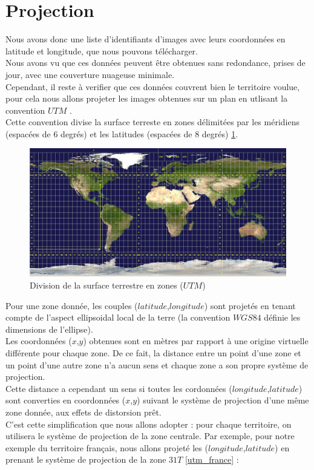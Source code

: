 \documentclass{book}
\begin{document}
\clearpage

\section{Projection}

Nous avons donc une liste d'identifiants d'images avec leurs coordonnées en latitude et longitude, que nous pouvons télécharger.\\
Nous avons vu que ces données peuvent être obtenues sans redondance, prises de jour, avec une couverture nuageuse minimale.\\
Cependant, il reste à verifier que ces données couvrent bien le territoire voulue, pour cela nous allons projeter les images obtenues
sur un plan en utlisant la convention $UTM$ \cite{wiki:utm}.\\
Cette convention divise la surface terreste en zones délimitées par les méridiens (espacées de 6 degrés) et 
les latitudes (espacées de 8 degrés) \ref{utm}.
\begin{figure}[H]
\begin{center}
\includegraphics[scale=0.3]{images/utm_zones.jpg}
\end{center}
\caption{Division de la surface terrestre en zones ($UTM$) \cite{wiki:utm}}
\label{utm}
\end{figure}

\clearpage

Pour une zone donnée, les couples ($latitude$,$longitude$) sont projetés en tenant compte de l'aspect ellipsoidal local de la terre 
(la convention $WGS84$ définie les dimensions de l'ellipse).\\
Les coordonnées ($x$,$y$) obtenues sont en mètres par rapport à une origine virtuelle différente pour chaque zone. De ce fait, la distance
entre un point d'une zone et un point d'une autre zone n'a aucun sens et chaque zone a son propre système de projection.\\
Cette distance a cependant un sens si toutes les cordonnées ($longitude$,$latitude$) sont converties en coordonnées ($x$,$y$) suivant
le système de projection d'une même zone donnée, aux effets de distorsion prêt.\\
C'est cette simplification que nous allons adopter : pour chaque territoire, on utilisera le système de projection de la zone centrale.
Par exemple, pour notre exemple du territoire français, nous allons projeté les ($longitude$,$latitude$) en prenant le système de projection
de la zone $31T$ \ref{utm_france} :
\end{document}
